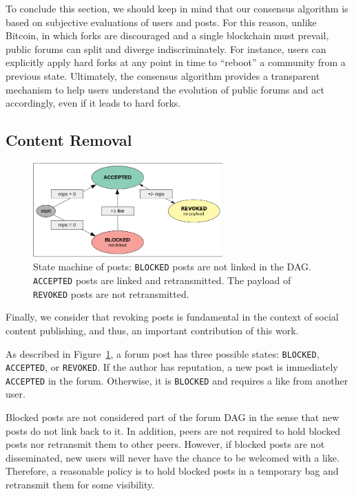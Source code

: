 \documentclass[12pt]{article}
\newcommand{\code}[1]  {\texttt{\footnotesize{#1}}}
\begin{document}
To conclude this section, we should keep in mind that our consensus algorithm
is based on subjective evaluations of users and posts.
For this reason, unlike Bitcoin, in which forks are discouraged and a single
blockchain must prevail, public forums can split and diverge indiscriminately.
For instance, users can explicitly apply hard forks at any point in time to
``reboot'' a community from a previous state.
Ultimately, the consensus algorithm provides a transparent mechanism to help
users understand the evolution of public forums and act accordingly, even if it
leads to hard forks.

\subsection{Content Removal}

\begin{figure}
\centering
\includegraphics[width=0.65\textwidth]{state-revoked.png}
\caption{
    State machine of posts:
    \code{BLOCKED} posts are not linked in the DAG.
    \code{ACCEPTED} posts are linked and retransmitted.
    The payload of \code{REVOKED} posts are not retransmitted.
}
\label{fig.state}
\end{figure}

Finally, we consider that revoking posts is fundamental in the context of
social content publishing, and thus, an important contribution of this work.

As described in Figure~\ref{fig.state}, a forum post has three possible states:
\code{BLOCKED}, \code{ACCEPTED}, or \code{REVOKED}.
%
If the author has reputation, a new post is immediately \code{ACCEPTED} in the
forum.
%
Otherwise, it is \code{BLOCKED} and requires a like from another user.

Blocked posts are not considered part of the forum DAG in the sense that new
posts do not link back to it.
In addition, peers are not required to hold blocked posts nor retransmit them
to other peers.
However, if blocked posts are not disseminated, new users will never have the
chance to be welcomed with a like.
Therefore, a reasonable policy is to hold blocked posts in a temporary bag and
retransmit them for some visibility.
\end{document}
